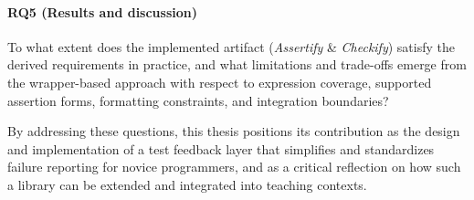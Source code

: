 \paragraph{RQ5 (Results and discussion)}
    \label{RQ5 (Results and discussion)}
To what extent does the implemented artifact (\emph{Assertify} \& \emph{Checkify}) satisfy the
derived requirements in practice, and what limitations and trade-offs emerge from the wrapper-based
approach with respect to expression coverage, supported assertion forms, formatting constraints,
and integration boundaries?


By addressing these questions, this thesis positions its contribution as the design and
implementation of a test feedback layer that simplifies and standardizes failure reporting for
novice programmers, and as a critical reflection on how such a library can be extended and
integrated into teaching contexts.






